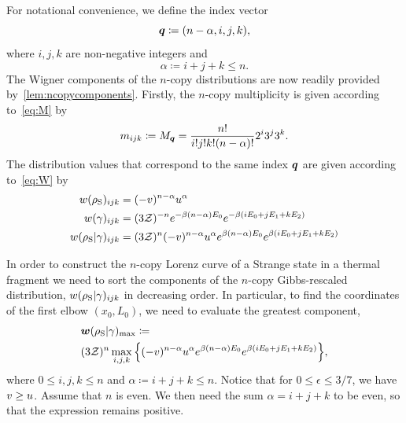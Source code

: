 \documentclass[pra,
aps,
twocolumn,
superscriptaddress,
groupedaddress,
nofootinbib,
reprint
]{revtex4-1}
\begin{document}
For notational convenience, we define the index vector
\begin{equation}
	\bm{q} \coloneqq (n-\alpha,i,j,k),
\end{equation}
where $i,j,k$ are non-negative integers and
\begin{equation*}
	\alpha \coloneqq i+j+k \leq n.
\end{equation*}
The Wigner components of the $n$-copy distributions are now readily provided by~\cref{lem:ncopycomponents}.
Firstly, the $n$-copy multiplicity is given according to~\cref{eq:M} by
\begin{equation}
	m_{ijk} \coloneqq M_{\bm{q}} = \frac{n!}{i!j!k!(n-\alpha)!} 2^i 3^j 3^k.
\end{equation}
The distribution values that correspond to the same index $\bm{q}$ are given according to~\cref{eq:W} by
\begin{align}
	w(\rho_{\rm{S}})_{ijk} &= (-v)^{n-\alpha} u^{\alpha} \\
	w(\gamma)_{ijk} &= (3\mathcal{Z})^{-n} e^{-\beta (n-\alpha)E_0} e^{-\beta ( i E_0 + j E_1 + k E_2 )} \\
	w(\rho_{\rm{S}} | \gamma)_{ijk} &= (3\mathcal{Z})^{n} (-v)^{n-\alpha} u^{\alpha} e^{\beta (n-\alpha)E_0} e^{\beta ( i E_0 + j E_1 + k E_2 )}
\end{align}

In order to construct the $n$-copy Lorenz curve of a Strange state in a thermal fragment we need to sort the components of the $n$-copy Gibbs-rescaled distribution, $w(\rho_{\rm{S}} | \gamma)_{ijk}$ in decreasing order.
In particular, to find the coordinates of the first elbow $(x_0, L_0)$, we need to evaluate the greatest component,
\begin{align}
	&\bm{w}(\rho_{\rm{S}} | \gamma)_{\rm{max}} \coloneqq \label{eq:max_slope}\\
	&(3\mathcal{Z})^{n} \max\limits_{i,j,k}\Big\{ (-v)^{n-\alpha} u^{\alpha} e^{\beta (n-\alpha)E_0} e^{\beta ( i E_0 + j E_1 + k E_2 )} \Big\}, \nonumber
\end{align}
where $0 \leq i,j,k \leq n$ and $\alpha \coloneqq i+j+k \leq n$.
Notice that for $0 \leq \epsilon \leq 3/7$, we have $v \geq u$.
Assume that $n$ is even. 
We then need the sum $\alpha = i+j+k$ to be even, so that the expression remains positive.
\end{document}
